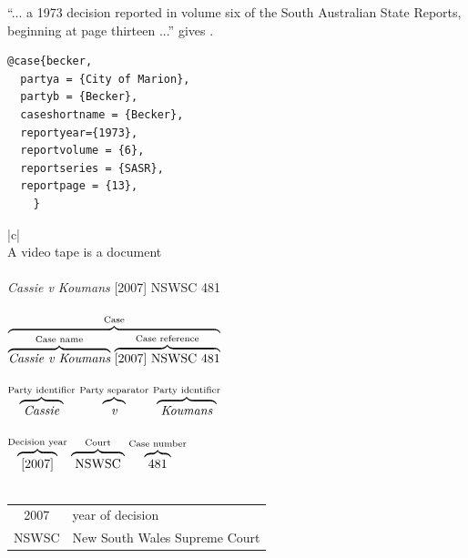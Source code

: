 
``... a 1973 decision reported in volume six of the South Australian State Reports, beginning at page thirteen ...'' gives \textcolor{red}{}.


{\small
\begin{verbatim}
@case{becker,
  partya = {City of Marion}, 
  partyb = {Becker},
  caseshortname = {Becker},
  reportyear={1973},
  reportvolume = {6},
  reportseries = {SASR},
  reportpage = {13},
	}
\end{verbatim}
}

 \newpage

\begin{table}
\begin{center}
\begin{tabular}{|c|}
\hline \\
A video tape is a document
\\ \\%
\textit{Cassie v Koumans} [2007] NSWSC 481
\\ \\%
$%
\stackrel{\textrm{Case}}{%
\overbrace{%
\stackrel{\textrm{Case name}}{\overbrace{\textit{Cassie v Koumans}}}\ 
\stackrel{\textrm{Case reference}}{\overbrace{\textrm{[2007] NSWSC 481}}}
}}
$%
\\ \\%
$%
\stackrel{\textrm{Party identifier}}{\overbrace{\textit{\phantom{[}Cassie\phantom{[}}}}\ 
\stackrel{\textrm{Party separator}}{\overbrace{\textit{\phantom{[}v\phantom{[}}}}\ 
\stackrel{\textrm{Party identifier}}{\overbrace{\textit{\phantom{[}Koumans\phantom{[}}}}\ 
$%
\\ \\%
$%
\stackrel{\textrm{Decision year}}{\overbrace{\textrm{\strut\phantom{[}[2007]\phantom{[}}}}\ 
\stackrel{\textrm{Court}}{\overbrace{\textrm{\strut\phantom{[}NSWSC\phantom{[}}}}\ \stackrel{\textrm{Case number}}{\overbrace{\textrm{\phantom{[}481\phantom{[}}}}\ 
$%
\\ \\%
\begin{tabular}{cl}
2007 & year of decision \\
NSWSC & New South Wales Supreme Court \\

\end{tabular}
\end{tabular}
\end{center}
\end{table}
